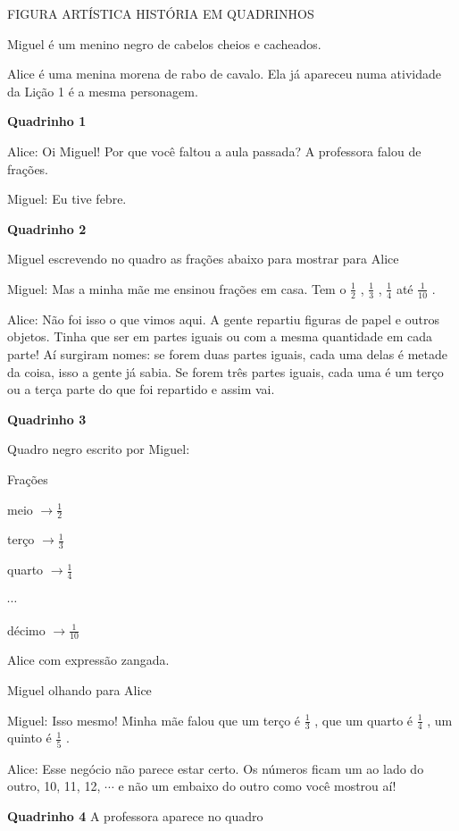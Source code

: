 \documentclass[a4,12pt]{book}
\newcounter{atividade}
\begin{document}
\begin{imagem*}[breakable]{}{}   FIGURA ARTÍSTICA
  HISTÓRIA EM QUADRINHOS

  Miguel é um menino negro de cabelos cheios e cacheados.

  Alice é uma menina morena de rabo de cavalo. Ela já apareceu numa atividade da Lição 1 é a mesma personagem.

  {\bf Quadrinho 1}

  Alice: Oi Miguel! Por que você faltou a aula passada? A professora falou de frações.

  Miguel: Eu tive febre.

  {\bf Quadrinho 2}

  Miguel escrevendo no quadro as frações abaixo para mostrar para Alice

  Miguel: Mas a minha mãe me ensinou frações em casa. Tem o   $\frac{1}{2}$  ,   $\frac{1}{3}$  ,   $\frac{1}{4}$   até   $\frac{1}{10}$  .

  Alice: Não foi isso o que vimos aqui. A gente repartiu figuras de papel e outros objetos. Tinha que ser em partes iguais ou com a mesma quantidade em cada parte! Aí surgiram nomes: se forem duas partes iguais, cada uma delas é metade da coisa, isso a gente já sabia. Se forem três partes iguais, cada uma é um terço ou a terça parte do que foi repartido e assim vai.

  {\bf Quadrinho 3}

  Quadro negro escrito por Miguel:

  Frações

  meio   $\longrightarrow \frac{1}{2}$

  terço   $\longrightarrow \frac{1}{3}$

  quarto   $\longrightarrow \frac{1}{4}$

  $\cdots$

  décimo   $\longrightarrow \frac{1}{10}$

  Alice com expressão zangada.

  Miguel olhando para Alice

  Miguel: Isso mesmo! Minha mãe falou que um terço é   $\frac{1}{3}$  , que um quarto é   $\frac{1}{4}$  , um quinto é   $\frac{1}{5}$  .

  Alice: Esse negócio não parece estar certo. Os números ficam um ao lado do outro, 10, 11, 12,   $\cdots$   e não um embaixo do outro como você mostrou aí!

  {\bf Quadrinho 4}
  A professora aparece no quadro


\end{imagem*}
\end{document}
